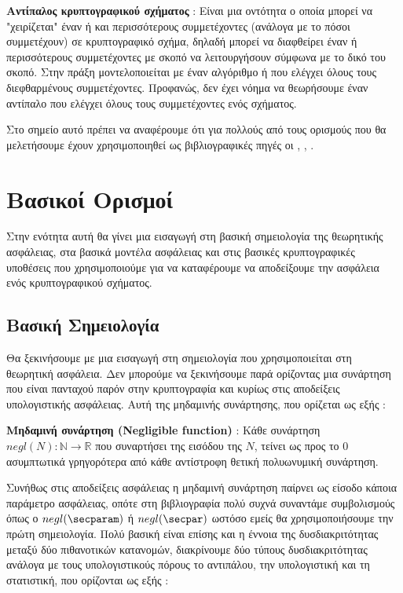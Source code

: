 \begin{definition}
\textbf{Αντίπαλος κρυπτογραφικού σχήματος} : Είναι μια οντότητα ο οποία μπορεί να "χειρίζεται" έναν ή και περισσότερους συμμετέχοντες (ανάλογα με το πόσοι συμμετέχουν) σε κρυπτογραφικό σχήμα, δηλαδή μπορεί να διαφθείρει έναν ή περισσότερους συμμετέχοντες με σκοπό να λειτουργήσουν σύμφωνα με το δικό του σκοπό. Στην πράξη μοντελοποιείται με έναν αλγόριθμο ή που ελέγχει όλους τους διεφθαρμένους συμμετέχοντες. Προφανώς, δεν έχει νόημα να θεωρήσουμε έναν αντίπαλο που ελέγχει όλους τους συμμετέχοντες ενός σχήματος.
\end{definition}

Στο σημείο αυτό πρέπει να αναφέρουμε ότι για πολλούς από τους ορισμούς που θα μελετήσουμε έχουν χρησιμοποιηθεί ως βιβλιογραφικές πηγές οι \cite{Bauer2011}, \cite{hoffstein2008introduction}, \cite{10.1561/3300000019}.

\section{Βασικοί Ορισμοί}

Στην ενότητα αυτή θα γίνει μια εισαγωγή στη βασική σημειολογία της θεωρητικής ασφάλειας, στα βασικά μοντέλα ασφάλειας και στις βασικές κρυπτογραφικές υποθέσεις που χρησιμοποιούμε για να καταφέρουμε να αποδείξουμε την ασφάλεια ενός κρυπτογραφικού σχήματος.

\subsection{Βασική Σημειολογία}

Θα ξεκινήσουμε με μια εισαγωγή στη σημειολογία που χρησιμοποιείται στη θεωρητική ασφάλεια. Δεν μπορούμε να ξεκινήσουμε παρά ορίζοντας μια συνάρτηση που είναι πανταχού παρόν στην κρυπτογραφία και κυρίως στις αποδείξεις υπολογιστικής ασφάλειας. Αυτή της μηδαμινής συνάρτησης, που ορίζεται ως εξής :

\begin{definition}
\textbf{Μηδαμινή συνάρτηση (Negligible function)} : Κάθε συνάρτηση $negl(N): \mathbb{N} \rightarrow \mathbb{R}$ που συναρτήσει της εισόδου της $Ν$, τείνει ως προς το $0$ ασυμπτωτικά γρηγορότερα από κάθε αντίστροφη θετική πολυωνυμική συνάρτηση.
\end{definition}

Συνήθως στις αποδείξεις ασφάλειας η μηδαμινή συνάρτηση παίρνει ως είσοδο κάποια παράμετρο ασφάλειας, οπότε στη βιβλιογραφία πολύ συχνά συναντάμε συμβολισμούς όπως ο $negl(\secparam)$ ή $negl(\secpar)$ ωστόσο εμείς θα χρησιμοποιήσουμε την πρώτη σημειολογία. Πολύ βασική είναι επίσης και η έννοια της δυσδιακριτότητας μεταξύ δύο πιθανοτικών κατανομών, διακρίνουμε δύο τύπους δυσδιακριτότητας ανάλογα με τους υπολογιστικούς πόρους το αντιπάλου, την υπολογιστική και τη στατιστική, που ορίζονται ως εξής :


